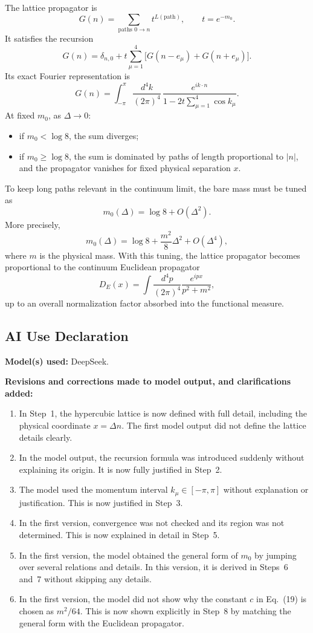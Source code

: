\documentclass[12pt]{article}
\begin{document}
The lattice propagator is
\[
G(n)=\sum_{\text{paths }0\to n} t^{L(\text{path})},
\qquad
t=e^{-m_0}.
\]
It satisfies the recursion
\[
G(n)=\delta_{n,0}
+
t\sum_{\mu=1}^4\bigl[G(n-e_\mu)+G(n+e_\mu)\bigr].
\]
Its exact Fourier representation is
\[
G(n)=
\int_{-\pi}^{\pi}\frac{d^4k}{(2\pi)^4}\,
\frac{e^{ik\cdot n}}{
1-2t\sum_{\mu=1}^4\cos k_\mu
}.
\]
At fixed \(m_0\), as \(\Delta\to 0\):
\begin{itemize}
    \item if \(m_0<\log 8\), the sum diverges;
    \item if \(m_0\ge \log 8\), the sum is dominated by paths of length proportional to \(|n|\), and the propagator vanishes for fixed physical separation \(x\).
\end{itemize}
To keep long paths relevant in the continuum limit, the bare mass must be tuned as
\[
\boxed{
m_0(\Delta)=\log 8+O(\Delta^2).
}
\]
More precisely,
\[
\boxed{
m_0(\Delta)
=
\log 8+\frac{m^2}{8}\Delta^2+O(\Delta^4),
}
\]
where \(m\) is the physical mass. With this tuning, the lattice propagator becomes proportional to the continuum Euclidean propagator
\[
D_E(x)=\int\frac{d^4p}{(2\pi)^4}\frac{e^{ipx}}{p^2+m^2},
\]
up to an overall normalization factor absorbed into the functional measure.

\subsection*{AI Use Declaration}

\textbf{Model(s) used:} DeepSeek.

\medskip
\noindent\textbf{Revisions and corrections made to model output, and clarifications added:}
\begin{enumerate}[label=\arabic*.]
    \item In Step~1, the hypercubic lattice is now defined with full detail, including the physical coordinate \(x=\Delta n\). The first model output did not define the lattice details clearly.
    \item In the model output, the recursion formula was introduced suddenly without explaining its origin. It is now fully justified in Step~2.
    \item The model used the momentum interval \(k_\mu\in[-\pi,\pi]\) without explanation or justification. This is now justified in Step~3.
    \item In the first version, convergence was not checked and its region was not determined. This is now explained in detail in Step~5.
    \item In the first version, the model obtained the general form of \(m_0\) by jumping over several relations and details. In this version, it is derived in Steps~6 and~7 without skipping any details.
    \item In the first version, the model did not show why the constant \(c\) in Eq.~(19) is chosen as \(m^2/64\). This is now shown explicitly in Step~8 by matching the general form with the Euclidean propagator.
\end{enumerate}
\end{document}
